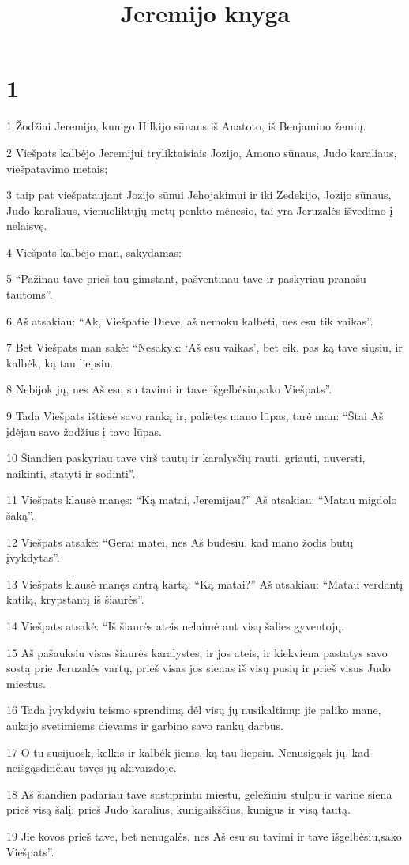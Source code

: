 

\title{Jeremijo knyga}


\chapter{1}


\par 1 Žodžiai Jeremijo, kunigo Hilkijo sūnaus iš Anatoto, iš Benjamino žemių. 
\par 2 Viešpats kalbėjo Jeremijui tryliktaisiais Jozijo, Amono sūnaus, Judo karaliaus, viešpatavimo metais; 
\par 3 taip pat viešpataujant Jozijo sūnui Jehojakimui ir iki Zedekijo, Jozijo sūnaus, Judo karaliaus, vienuoliktųjų metų penkto mėnesio, tai yra Jeruzalės išvedimo į nelaisvę. 
\par 4 Viešpats kalbėjo man, sakydamas: 
\par 5 “Pažinau tave prieš tau gimstant, pašventinau tave ir paskyriau pranašu tautoms”. 
\par 6 Aš atsakiau: “Ak, Viešpatie Dieve, aš nemoku kalbėti, nes esu tik vaikas”. 
\par 7 Bet Viešpats man sakė: “Nesakyk: ‘Aš esu vaikas’, bet eik, pas ką tave siųsiu, ir kalbėk, ką tau liepsiu. 
\par 8 Nebijok jų, nes Aš esu su tavimi ir tave išgelbėsiu,­sako Viešpats”. 
\par 9 Tada Viešpats ištiesė savo ranką ir, palietęs mano lūpas, tarė man: “Štai Aš įdėjau savo žodžius į tavo lūpas. 
\par 10 Šiandien paskyriau tave virš tautų ir karalysčių rauti, griauti, nuversti, naikinti, statyti ir sodinti”. 
\par 11 Viešpats klausė manęs: “Ką matai, Jeremijau?” Aš atsakiau: “Matau migdolo šaką”. 
\par 12 Viešpats atsakė: “Gerai matei, nes Aš budėsiu, kad mano žodis būtų įvykdytas”. 
\par 13 Viešpats klausė manęs antrą kartą: “Ką matai?” Aš atsakiau: “Matau verdantį katilą, krypstantį iš šiaurės”. 
\par 14 Viešpats atsakė: “Iš šiaurės ateis nelaimė ant visų šalies gyventojų. 
\par 15 Aš pašauksiu visas šiaurės karalystes, ir jos ateis, ir kiekviena pastatys savo sostą prie Jeruzalės vartų, prieš visas jos sienas iš visų pusių ir prieš visus Judo miestus. 
\par 16 Tada įvykdysiu teismo sprendimą dėl visų jų nusikaltimų: jie paliko mane, aukojo svetimiems dievams ir garbino savo rankų darbus. 
\par 17 O tu susijuosk, kelkis ir kalbėk jiems, ką tau liepsiu. Nenusigąsk jų, kad neišgąsdinčiau tavęs jų akivaizdoje. 
\par 18 Aš šiandien padariau tave sustiprintu miestu, geležiniu stulpu ir varine siena prieš visą šalį: prieš Judo karalius, kunigaikščius, kunigus ir visą tautą. 
\par 19 Jie kovos prieš tave, bet nenugalės, nes Aš esu su tavimi ir tave išgelbėsiu,­sako Viešpats”.


